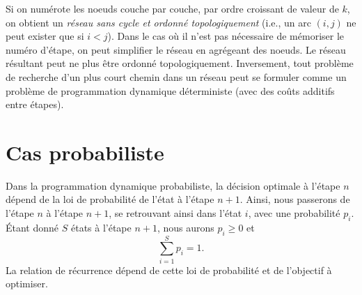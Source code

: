 Si on numérote les noeuds couche par couche, par ordre croissant de 
valeur de $k$, on obtient un \emph{réseau sans cycle et ordonné topologiquement}
(i.e., un arc $(i,j)$ ne peut exister que si $i<j$).
Dans le cas où il n'est pas nécessaire de mémoriser le numéro 
d'étape, on peut simplifier le réseau en agrégeant des noeuds.
Le réseau résultant peut ne plus être ordonné topologiquement.
Inversement, tout problème de recherche d'un plus court chemin dans
un réseau peut se formuler comme un problème de programmation dynamique déterministe (avec des coûts additifs entre étapes).

\section{Cas probabiliste}

Dans la programmation dynamique probabiliste, la décision optimale à l'étape $n$ dépend de la loi de probabilité de l'état à l'étape $n+1$.
Ainsi, nous passerons de l'étape $n$ à l'étape $n+1$, se retrouvant ainsi dans l'état $i$, avec une probabilité $p_i$.
Étant donné $S$ états à l'étape $n+1$, nous aurons $p_i \geq 0$ et
\[
\sum_{i=1}^S p_i = 1.
\]
La relation de récurrence dépend de cette loi de probabilité et de l'objectif à optimiser.

